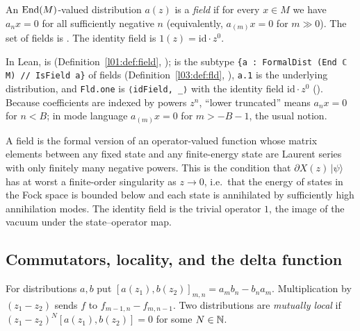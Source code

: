 \begin{definition}\label{ch07:def:field}
An $\operatorname{End}(M)$-valued distribution $a(z)$ is a \emph{field} if for every $x\in M$ we have
$a_n x = 0$ for all sufficiently negative $n$ (equivalently, $a_{(m)}x = 0$ for $m\gg0$). The
set of fields is . The identity field is $1(z) = \mathrm{id}\cdot z^0$.
\end{definition}

In Lean,  is
 (Definition~\ref{l01:def:field}, );
 is the subtype \verb|{a : FormalDist (End ℂ M) // IsField a}| of fields
(Definition~\ref{l03:def:fld}, ), \verb|a.1| is the underlying
distribution, and \verb|Fld.one| is \verb|⟨idField, _⟩| with  the identity field
$\mathrm{id}\cdot z^0$ (). Because coefficients are indexed by
powers $z^n$, ``lower truncated'' means $a_n x = 0$ for $n < B$; in mode language
$a_{(m)} x = 0$ for $m > -B-1$, the usual notion.

\begin{physics}
A field is the formal version of an operator-valued function whose matrix elements between any fixed state and any finite-energy state are Laurent series with only finitely many negative powers. This is the condition that $\partial X(z)\,|\psi\rangle$ has at worst a finite-order singularity as $z\to0$, i.e.\ that the energy of states in the Fock space is bounded below and each state is annihilated by sufficiently high annihilation modes. The identity field is the trivial operator $1$, the image of the vacuum under the state--operator map.
\end{physics}

\subsection{Commutators, locality, and the delta function}\label{ch07:sec:local}

\begin{definition}
\label{ch07:def:local}
For distributions $a, b$ put $[a(z_1),b(z_2)]_{m,n} = a_m b_n - b_n a_m$. Multiplication by
$(z_1-z_2)$ sends $f$ to $f_{m-1,n} - f_{m,n-1}$. Two distributions are \emph{mutually local}
if $(z_1-z_2)^N[a(z_1),b(z_2)] = 0$ for some $N\in{\mathbb{N}}$.
\end{definition}

